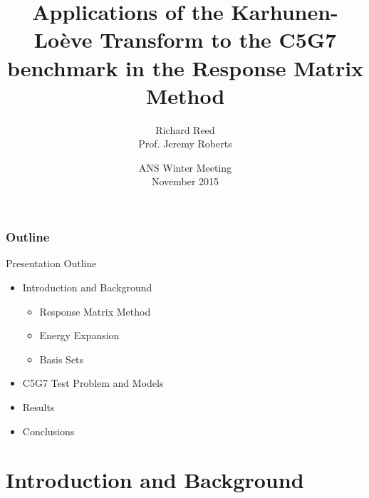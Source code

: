 \documentclass[fleqn]{beamer}
\title[KLT Basis for Energy Expansion]{
    Applications of the Karhunen-Lo\`{e}ve Transform to the C5G7 benchmark in
    the Response Matrix Method}
\author[Richard Reed]{
    Richard Reed \\
    Prof. Jeremy Roberts}
\institute[Kansas State University]{
    Mechanical and Nuclear Engineering \\
    Kansas State University}
\date[ANS Winter Meeting 2015]{
    ANS Winter Meeting \\
    November 2015}
\begin{document}
    \newcommand{\beginbackup}{
        \newcounter{framenumbervorappendix}
        \setcounter{framenumbervorappendix}{\value{framenumber}}
    }
    \newcommand{\backupend}{
        \addtocounter{framenumbervorappendix}{-\value{framenumber}}
        \addtocounter{framenumber}{\value{framenumbervorappendix}}
    }

    \begin{frame}
        \titlepage
    \end{frame}

    \begin{frame}
        \frametitle{Outline}
        \begin{block}{Presentation Outline}
            \begin{itemize}
                \item Introduction and Background
                \begin{itemize}
                    \item Response Matrix Method
                    \item Energy Expansion
                    \item Basis Sets
                \end{itemize}
                \item C5G7 Test Problem and Models
                \item Results
                \item Conclusions
            \end{itemize}
        \end{block}
    \end{frame}

    \section{Introduction and Background}
\end{document}
